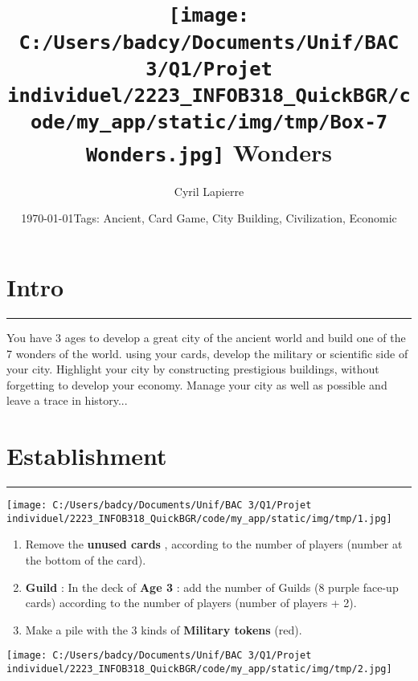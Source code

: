 \documentclass{scrartcl}%
\title{\texttt{[image: C:/Users/badcy/Documents/Unif/BAC 3/Q1/Projet individuel/2223\_INFOB318\_QuickBGR/code/my\_app/static/img/tmp/Box-7 Wonders.jpg]}\break 7 Wonders }%
\author{Cyril Lapierre}%
\date{\today \break Tags: Ancient, Card Game, City Building, Civilization, Economic}%
\begin{document}
%
\normalsize%
\maketitle\thispagestyle{header}%
\pagestyle{header}%
\sectionfont{\color{blue}}%
\subsectionfont{\color{blue}}%
\subsubsectionfont{\color{blue}}%
\section{ Intro
}%
\label{sec:Intro}%
\textcolor{blue}{\rule{18cm}{0.07cm}}\break%
You have 3 ages to develop a great city of the ancient world and build one of the 7 wonders of the
%
world. using your cards, develop the military or scientific side of your city. Highlight
%
your city by constructing prestigious buildings, without forgetting to develop your economy.
%
Manage your city as well as possible and leave a trace in history...


%
\sectionfont{\color{mygreen}}%
\subsectionfont{\color{mygreen}}%
\subsubsectionfont{\color{mygreen}}%
\section{ Establishment
}%
\label{sec:Establishment}%
\textcolor{mygreen}{\rule{18cm}{0.07cm}}\break%
%
\begin{center}\texttt{[image: C:/Users/badcy/Documents/Unif/BAC 3/Q1/Projet individuel/2223\_INFOB318\_QuickBGR/code/my\_app/static/img/tmp/1.jpg]}\end{center}%

%
\begin{enumerate}%
\item%
%
 Remove the %
\textcolor{mygreen}{%
\textbf{unused cards}%
}%
, according to the number of players (number at the bottom of the card).
%
\item%
%
\textcolor{mygreen}{%
\textbf{Guild}%
}%
: In the deck of %
\textcolor{mygreen}{%
\textbf{Age 3}%
}%
: add the number of Guilds (8 purple face{-}up cards) according to the number of players (number of players + 2).
%
\item%
%
 Make a pile with the 3 kinds of %
\textcolor{mygreen}{%
\textbf{Military tokens}%
}%
\textit{ }%
 (red).
%
\end{enumerate}%
%
\begin{center}\texttt{[image: C:/Users/badcy/Documents/Unif/BAC 3/Q1/Projet individuel/2223\_INFOB318\_QuickBGR/code/my\_app/static/img/tmp/2.jpg]}\end{center}%
\end{document}
